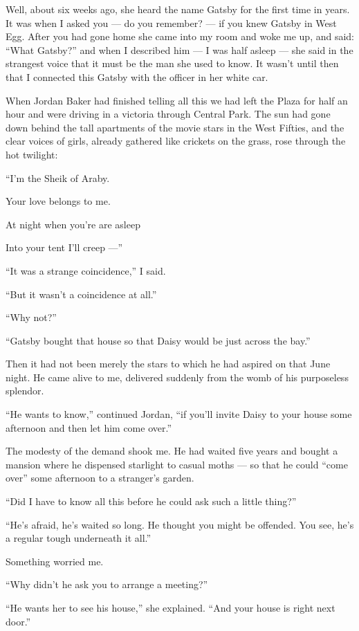 \documentclass{znotebook}
\begin{document}
Well, about six weeks ago, she heard the name Gatsby for the first time in years. It was when I asked you ---{} do you remember? ---{} if you knew Gatsby in West Egg. After you had gone home she came into my room and woke me up, and said: ``What Gatsby?'' and when I described him ---{} I was half asleep ---{} she said in the strangest voice that it must be the man she used to know. It wasn't until then that I connected this Gatsby with the officer in her white car.

When Jordan Baker had finished telling all this we had left the Plaza for half an hour and were driving in a victoria through Central Park. The sun had gone down behind the tall apartments of the movie stars in the West Fifties, and the clear voices of girls, already gathered like crickets on the grass, rose through the hot twilight:

``I'm the Sheik of Araby.

Your love belongs to me.

At night when you're are asleep

Into your tent I'll creep ---''

``It was a strange coincidence,'' I said.

``But it wasn't a coincidence at all.''

``Why not?''

``Gatsby bought that house so that Daisy would be just across the bay.''

Then it had not been merely the stars to which he had aspired on that June night. He came alive to me, delivered suddenly from the womb of his purposeless splendor.

``He wants to know,'' continued Jordan, ``if you'll invite Daisy to your house some afternoon and then let him come over.''

The modesty of the demand shook me. He had waited five years and bought a mansion where he dispensed starlight to casual moths ---{} so that he could ``come over'' some afternoon to a stranger's garden.

``Did I have to know all this before he could ask such a little thing?''

``He's afraid, he's waited so long. He thought you might be offended. You see, he's a regular tough underneath it all.''

Something worried me.

``Why didn't he ask you to arrange a meeting?''

``He wants her to see his house,'' she explained. ``And your house is right next door.''
\end{document}
